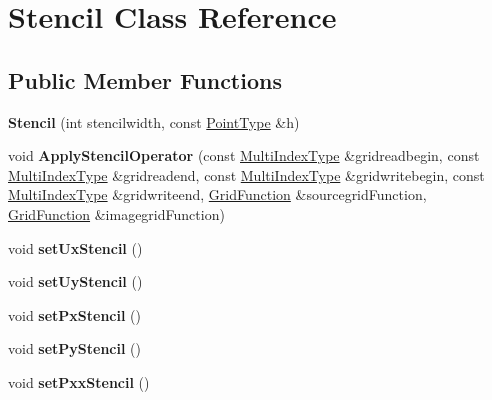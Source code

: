 \hypertarget{class_stencil}{\section{Stencil Class Reference}
\label{class_stencil}
}
\subsection*{Public Member Functions}
\begin{DoxyCompactItemize}
\item 
\hypertarget{class_stencil_a0d9be2b06dc061f3db6f5cb1b9eb4047}{{\bfseries Stencil} (int stencilwidth, const \hyperlink{class_array}{Point\-Type} \&h)}\label{class_stencil_a0d9be2b06dc061f3db6f5cb1b9eb4047}

\item 
\hypertarget{class_stencil_a448e7606ce3d356e7ea88f6043a0327e}{void {\bfseries Apply\-Stencil\-Operator} (const \hyperlink{class_array}{Multi\-Index\-Type} \&gridreadbegin, const \hyperlink{class_array}{Multi\-Index\-Type} \&gridreadend, const \hyperlink{class_array}{Multi\-Index\-Type} \&gridwritebegin, const \hyperlink{class_array}{Multi\-Index\-Type} \&gridwriteend, \hyperlink{class_grid_function}{Grid\-Function} \&sourcegrid\-Function, \hyperlink{class_grid_function}{Grid\-Function} \&imagegrid\-Function)}\label{class_stencil_a448e7606ce3d356e7ea88f6043a0327e}

\item 
\hypertarget{class_stencil_a3b339acd31df97458e31882e752f3f41}{void {\bfseries set\-Ux\-Stencil} ()}\label{class_stencil_a3b339acd31df97458e31882e752f3f41}

\item 
\hypertarget{class_stencil_a47dfd59b69103c4edf96639432a3a30f}{void {\bfseries set\-Uy\-Stencil} ()}\label{class_stencil_a47dfd59b69103c4edf96639432a3a30f}

\item 
\hypertarget{class_stencil_a1c51b1b3aa6f08806c1a257ac219c7e5}{void {\bfseries set\-Px\-Stencil} ()}\label{class_stencil_a1c51b1b3aa6f08806c1a257ac219c7e5}

\item 
\hypertarget{class_stencil_a0244873531487b090cf3a067a10b6963}{void {\bfseries set\-Py\-Stencil} ()}\label{class_stencil_a0244873531487b090cf3a067a10b6963}

\item 
\hypertarget{class_stencil_a34e54951517bf5ea3bd3f8f111bf9949}{void {\bfseries set\-Pxx\-Stencil} ()}\label{class_stencil_a34e54951517bf5ea3bd3f8f111bf9949}


\end{DoxyCompactItemize}
